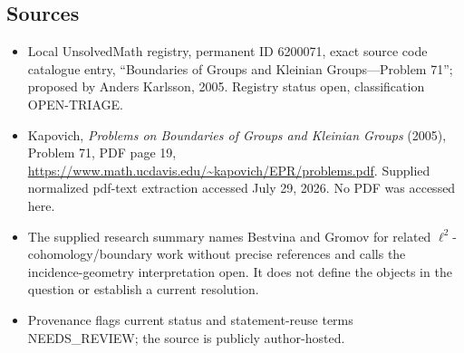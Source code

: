 \documentclass[11pt]{article}
\begin{document}
\subsection{Sources}
\begin{itemize}
\item Local UnsolvedMath registry, permanent ID 6200071, exact source code catalogue entry, ``Boundaries of Groups and Kleinian Groups---Problem 71''; proposed by Anders Karlsson, 2005. Registry status open, classification OPEN-TRIAGE.
\item Kapovich, \emph{Problems on Boundaries of Groups and Kleinian Groups} (2005), Problem 71, PDF page 19, \url{https://www.math.ucdavis.edu/~kapovich/EPR/problems.pdf}. Supplied normalized pdf-text extraction accessed July 29, 2026. No PDF was accessed here.
\item The supplied research summary names Bestvina and Gromov for related $\ell^2$-cohomology/boundary work without precise references and calls the incidence-geometry interpretation open. It does not define the objects in the question or establish a current resolution.
\item Provenance flags current status and statement-reuse terms NEEDS\_REVIEW; the source is publicly author-hosted.
\end{itemize}
\end{document}
